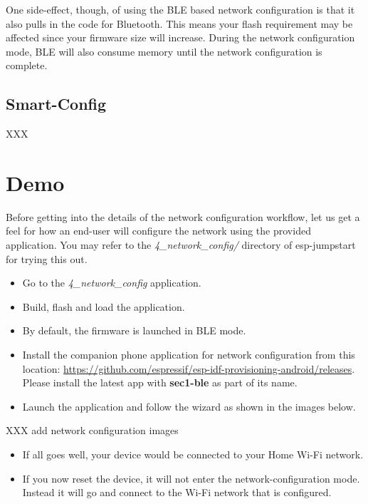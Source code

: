 \documentclass[main.tex]{subfiles}
\begin{document}
One side-effect, though, of using the BLE based network configuration is that it also pulls in the code for Bluetooth. This means your flash requirement may be affected since your firmware size will increase. During the network configuration mode, BLE will also consume memory until the network configuration is complete.

\subsection{Smart-Config}
XXX

\section{Demo}
Before getting into the details of the network configuration workflow, let us get a feel for how an end-user will configure the network using the provided application.
You may refer to the \textit{4\_network\_config/} directory of esp-jumpstart for trying this out.

\begin{itemize}
    \item Go to the \textit{4\_network\_config} application.
    \item Build, flash and load the application.
    \item By default, the firmware is launched in BLE mode.
    \item Install the companion phone application for network configuration from this location: \url{https://github.com/espressif/esp-idf-provisioning-android/releases}. Please install the latest app with \textbf{sec1-ble} as part of its name.
    \item Launch the application and follow the wizard as shown in the images below.
\end{itemize}


XXX add network configuration images

\begin{itemize}
    \item If all goes well, your device would be connected to your Home Wi-Fi network.
    \item If you now reset the device, it will not enter the network-configuration mode. Instead it will go and connect to the Wi-Fi network that is configured.
\end{itemize}
\end{document}
